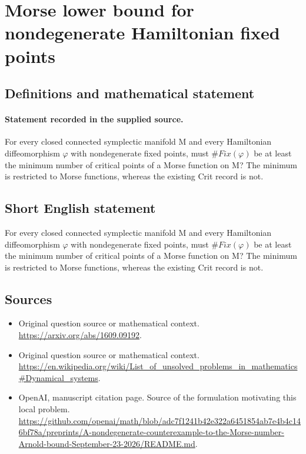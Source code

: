 \documentclass[11pt]{article}
\begin{document}
\section*{Morse lower bound for nondegenerate Hamiltonian fixed points}\label{statement}
\subsection{Definitions and mathematical statement}
\paragraph{Statement recorded in the supplied source.}
For every closed connected symplectic manifold M and every Hamiltonian diffeomorphism $\varphi $ with nondegenerate fixed points, must $\#Fix(\varphi )$ be at least the minimum number of critical points of a Morse function on M? The minimum is restricted to Morse functions, whereas the existing Crit record is not.
\subsection{Short English statement}
For every closed connected symplectic manifold M and every Hamiltonian diffeomorphism $\varphi $ with nondegenerate fixed points, must $\#Fix(\varphi )$ be at least the minimum number of critical points of a Morse function on M? The minimum is restricted to Morse functions, whereas the existing Crit record is not.
\subsection{Sources}
\begin{itemize}
\item[S1] Original question source or mathematical context.
\url{https://arxiv.org/abs/1609.09192}.
\item[S2] Original question source or mathematical context.
\url{https://en.wikipedia.org/wiki/List_of_unsolved_problems_in_mathematics#Dynamical_systems}.
\item[S3] OpenAI, manuscript citation page. Source of the formulation motivating this local problem.
\url{https://github.com/openai/math/blob/adc7f1241b42e322a6451854ab7e4b4c146bf78a/preprints/A-nondegenerate-counterexample-to-the-Morse-number-Arnold-bound-September-23-2026/README.md}.
\end{itemize}
\end{document}
